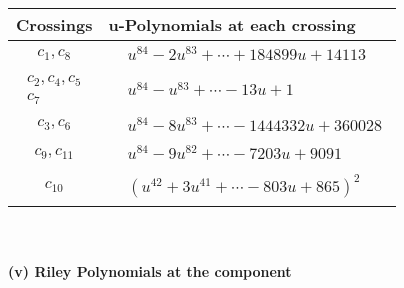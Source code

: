 \documentclass[1p]{elsarticle_modified}
\theoremstyle{definition}
\begin{document}
\begin{tabular}{m{50pt}|m{274pt}}
Crossings & \hspace{64pt}u-Polynomials at each crossing \\
\hline $$\begin{aligned}c_{1},c_{8}\end{aligned}$$&$\begin{aligned}
&u^{84}-2 u^{83}+\cdots+184899 u+14113
\end{aligned}$\\
\hline $$\begin{aligned}c_{2},c_{4},c_{5}\\c_{7}\end{aligned}$$&$\begin{aligned}
&u^{84}- u^{83}+\cdots-13 u+1
\end{aligned}$\\
\hline $$\begin{aligned}c_{3},c_{6}\end{aligned}$$&$\begin{aligned}
&u^{84}-8 u^{83}+\cdots-1444332 u+360028
\end{aligned}$\\
\hline $$\begin{aligned}c_{9},c_{11}\end{aligned}$$&$\begin{aligned}
&u^{84}-9 u^{82}+\cdots-7203 u+9091
\end{aligned}$\\
\hline $$\begin{aligned}c_{10}\end{aligned}$$&$\begin{aligned}
&(u^{42}+3 u^{41}+\cdots-803 u+865)^{2}
\end{aligned}$\\
\hline
\end{tabular}\\~\\
\newpage\renewcommand{\arraystretch}{1}
\flushleft \textbf{(v) Riley Polynomials at the component}\newline \\
\end{document}
